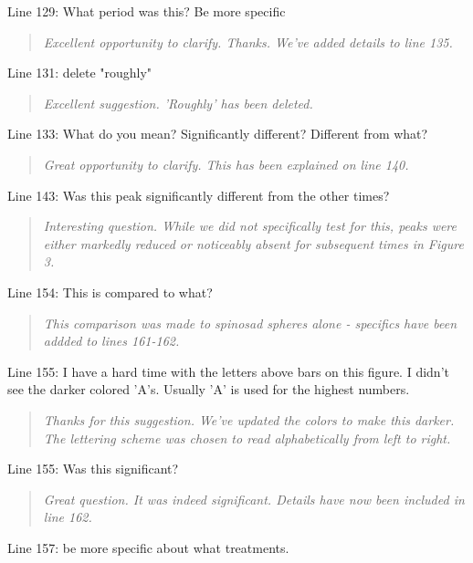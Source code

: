\documentclass{article}
\begin{document}
Line 129: What period was this? Be more specific

\begin{quote}
    \textit{Excellent opportunity to clarify.  Thanks.  We've added details to line 135.
    }
\end{quote}

Line 131: delete "roughly"

\begin{quote}
    \textit{Excellent suggestion.  'Roughly' has been deleted.  }
\end{quote}

Line 133: What do you mean? Significantly different? Different from what?

\begin{quote}
    \textit{Great opportunity to clarify.  This has been explained on line 140.
    }
\end{quote}

Line 143: Was this peak significantly different from the other times?

\begin{quote}
    \textit{Interesting question.  While we did not specifically test for this, peaks were either markedly reduced or noticeably absent for subsequent times in Figure 3.  }
\end{quote}

Line 154: This is compared to what?

\begin{quote}
    \textit{This comparison was made to spinosad spheres alone - specifics have been addded to lines 161-162.
    }
\end{quote}

Line 155: I have a hard time with the letters above bars on this figure. I didn't see the darker colored 'A's. Usually 'A' is used for the highest numbers.

\begin{quote}
    \textit{Thanks for this suggestion.  We've updated the colors to make this darker.  The lettering scheme was chosen to read alphabetically from left to right.  }
\end{quote}

Line 155: Was this significant?

\begin{quote}
    \textit{Great question.  It was indeed significant.  Details have now been included in line 162. 
    }
\end{quote}

Line 157: be more specific about what treatments.  
\end{document}
